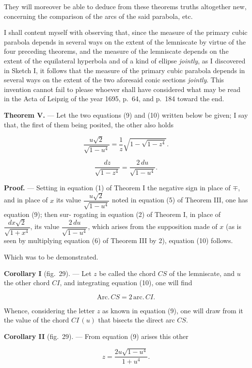 \documentclass{article}
\begin{document}
They will moreover be able to deduce from these theorems truths altogether new, concerning the
comparison of the arcs of the said parabola, etc.

I shall content myself with observing that, since the measure of the primary cubic parabola
depends in several ways on the extent of the lemniscate by virtue of the four preceding
theorems, and the measure of the lemniscate depends on the extent of the equilateral hyperbola
and of a kind of ellipse \emph{jointly}, as I discovered in Sketch I, it follows that the measure
of the primary cubic parabola depends in several ways on the extent of the two aforesaid conic
sections \emph{jointly}. This invention cannot fail to please whoever shall have considered what
may be read in the Acta of Leipzig of the year 1695, p.~64, and p.~184 toward the end.

\textbf{Theorem V.} --- Let the two equations (9) and (10) written below be given; I say that,
the first of them being posited, the other also holds

\[ \frac{u\sqrt{2}}{\sqrt{1-u^{4}}} = \frac{1}{z}\sqrt{1-\sqrt{1-z^{4}}}. \tag{9} \]

\[ \frac{dz}{\sqrt{1-z^{4}}} = \frac{2\,du}{\sqrt{1-u^{4}}}. \tag{10} \]

\textbf{Proof.} --- Setting in equation (1) of Theorem I the negative sign in place of $\mp$, and
in place of $x$ its value $\dfrac{u\sqrt{2}}{\sqrt{1-u^{4}}}$ noted in equation (5) of Theorem
III, one has equation (9); then sur-
rogating in equation (2) of Theorem I, in place of $\dfrac{dx\sqrt{2}}{\sqrt{1+x^{4}}}$, its
value $\dfrac{2\,du}{\sqrt{1-u^{4}}}$, which arises from the supposition made of $x$ (as is seen
by multiplying equation (6) of Theorem III by 2), equation (10) follows.

Which was to be demonstrated.

\textbf{Corollary I} (fig.~29). --- Let $z$ be called the chord $CS$ of the lemniscate, and $u$
the other chord $CI$, and integrating equation (10), one will find

\[ \mathrm{Arc.}\,CS = 2\,\mathrm{arc.}\,CI. \]

Whence, considering the letter $z$ as known in equation (9), one will draw from it the value of
the chord $CI\,(u)$ that bisects the direct arc $CS$.

\textbf{Corollary II} (fig.~29). --- From equation (9) arises this other

\[ z = \frac{2u\sqrt{1-u^{4}}}{1+u^{4}}. \tag{11} \]
\end{document}
